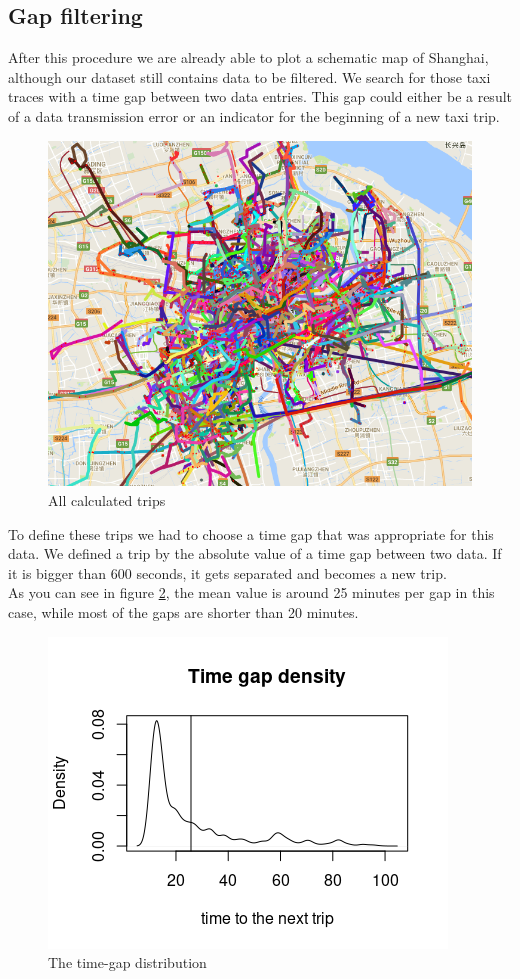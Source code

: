 \documentclass[11pt,conference,a4paper,twocolumns,romanappendices]{IEEEtran}
\begin{document}
\subsection{Gap filtering}
After this procedure we are already able to plot a schematic map of Shanghai, although our dataset still contains data to be filtered. We search for those taxi traces with a time gap between two data entries. This gap could either be a result of a data transmission error or an indicator for the beginning of a new taxi trip.\\
\begin{figure}[h]
\centering
\includegraphics[scale=0.35]{plotalltrips.png}
\caption{\label{fig:plotalltrips}All calculated trips}
\end{figure}
To define these trips we had to choose a time gap that was appropriate for this data. We defined a trip by the absolute value of a time gap between two data. If it is bigger than 600 seconds, it gets separated and becomes a new trip.\\
As you can see in figure \ref{fig:timegap}, the mean value is around 25 minutes per gap in this case, while most of the gaps are shorter than 20 minutes. \\
\begin{figure}[h]
\centering
\includegraphics[scale=0.75]{timegap.png}
\caption{\label{fig:timegap}The time-gap distribution}
\end{figure}
\end{document}
